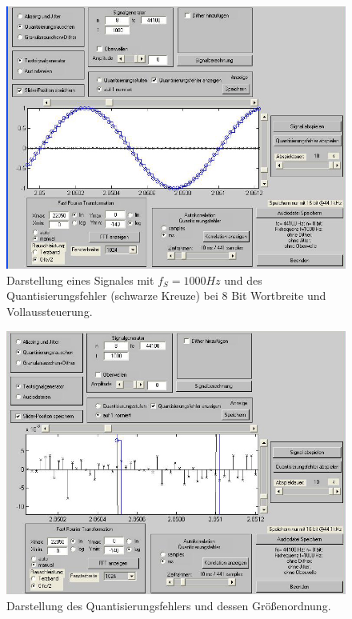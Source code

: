\begin{figure}[h!]
\centering
\includegraphics[width=\columnwidth]{figures/Aufg1/2_1_1.JPG} 
\caption{Darstellung eines Signales mit $f_S = 1000Hz$ und des Quantisierungsfehler (schwarze Kreuze) bei 8 Bit Wortbreite und Vollaussteuerung.}
\end{figure}

\begin{figure}[h!]
\centering
\includegraphics[width=\columnwidth]{figures/Aufg1/2_1_3.JPG} 
\caption{Darstellung des Quantisierungsfehlers und dessen Größenordnung.}
\end{figure}

